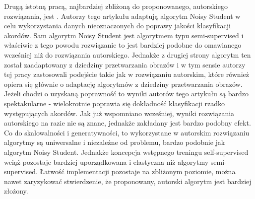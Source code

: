 Drugą istotną pracą, najbardziej zbliżoną do proponowanego, autorskiego rozwiązania, jest
\cite{bortolozzo_improving_2021}. Autorzy tego artykułu adaptują algorytm Noisy Student w celu
wykorzystania danych nieoznaczonych do poprawy jakości klasyfikacji akordów. Sam algorytm Noisy
Student jest algorytmem typu semi-supervised i właściwie z tego powodu rozwiązanie to jest bardziej
podobne do omawianego wcześniej \cite{wu_semi-supervised_2020} niż do rozwiązania autorskiego.
Jednakże z drugiej strony algorytm ten został zaadaptowany z dziedziny przetwarzania obrazów i w tym
sensie autorzy tej pracy zastosowali podejście takie jak w rozwiązaniu autorskim, które również
opiera się głównie o adaptację algorytmów z dziedziny przetwarzania obrazów. Jeżeli chodzi o
uzyskaną poprawność to wyniki autorów tego artykułu są bardzo spektakularne - wielokrotnie poprawia
się dokładność klasyfikacji rzadko występujących akordów. Jak już wspomniano wcześniej, wyniki
rozwiązania autorskiego na razie nie są znane, jednakże zakładany jest bardzo podobny efekt. Co do
skalowalności i generatywności, to wykorzystane w autorskim rozwiązaniu algorytmy są uniwersalne i
niezależne od problemu, bardzo podobnie jak algorytm Noisy Student. Jednakże koncepcja wstępnego
treningu self-supervised wciąż pozostaje bardziej uporządkowana i elastyczna niż algorytmy
semi-supervised. Łatwość implementacji pozostaje na zbliżonym poziomie, można nawet zaryzykować
stwierdzenie, że proponowany, autorski algorytm jest bardziej złożony.
